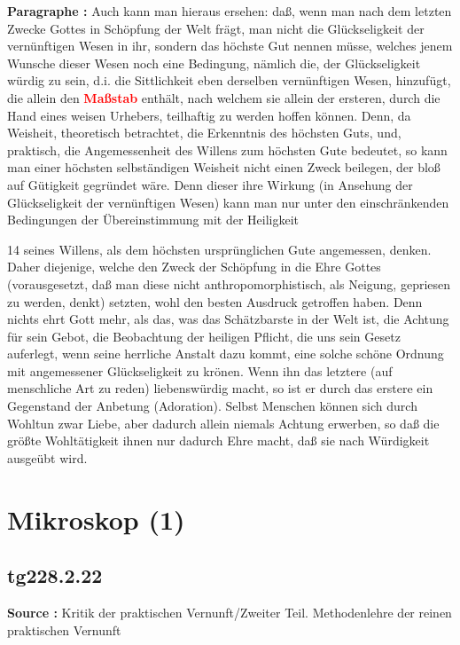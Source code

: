 \documentclass[a4paper,12pt,twoside]{book}
\newcommand{\match}[1]{\textcolor{red}{\textbf{#1}}}
\newcommand{\unnumberedsection}[1]{
	\section*{#1}
	\addcontentsline{toc}{section}{#1}
	\markright{#1}
}
\begin{document}
	\textbf{Paragraphe : }Auch kann man hieraus ersehen: daß, wenn man nach dem letzten Zwecke Gottes in Schöpfung der Welt frägt, man nicht die Glückseligkeit der vernünftigen Wesen in ihr, sondern das höchste Gut nennen müsse, welches jenem Wunsche dieser Wesen noch eine Bedingung, nämlich die, der Glückseligkeit würdig zu sein, d.i. die Sittlichkeit eben derselben vernünftigen Wesen, hinzufügt, die allein den \match{Maßstab} enthält, nach welchem sie allein der ersteren, durch die Hand eines weisen Urhebers, teilhaftig zu werden hoffen können. Denn, da Weisheit, theoretisch betrachtet, die Erkenntnis des höchsten Guts, und, praktisch, die Angemessenheit des Willens zum höchsten Gute bedeutet, so kann man einer höchsten selbständigen Weisheit nicht einen Zweck beilegen, der bloß auf Gütigkeit gegründet wäre. Denn dieser ihre Wirkung (in Ansehung der Glückseligkeit der vernünftigen Wesen)  kann man nur unter den einschränkenden Bedingungen der Übereinstimmung mit der Heiligkeit
	
	
	
	14
	seines Willens, als dem höchsten ursprünglichen Gute angemessen, denken. Daher diejenige, welche den Zweck der Schöpfung in die Ehre Gottes (vorausgesetzt, daß man diese nicht anthropomorphistisch, als Neigung, gepriesen zu werden, denkt) setzten, wohl den besten Ausdruck getroffen haben. Denn nichts ehrt Gott mehr, als das, was das Schätzbarste in der Welt ist, die Achtung für sein Gebot, die Beobachtung der heiligen Pflicht, die uns sein Gesetz auferlegt, wenn seine herrliche Anstalt dazu kommt, eine solche schöne Ordnung mit angemessener Glückseligkeit zu krönen. Wenn ihn das letztere (auf menschliche Art zu reden) liebenswürdig macht, so ist er durch das erstere ein Gegenstand der Anbetung (Adoration). Selbst Menschen können sich durch Wohltun zwar Liebe, aber dadurch allein niemals Achtung erwerben, so daß die größte Wohltätigkeit ihnen nur dadurch Ehre macht, daß sie nach Würdigkeit ausgeübt wird. 
	
	\unnumberedsection{Mikroskop (1)} 
	\subsection*{tg228.2.22} 
	\textbf{Source : }Kritik der praktischen Vernunft/Zweiter Teil. Methodenlehre der reinen praktischen Vernunft\\  
	
\end{document}
